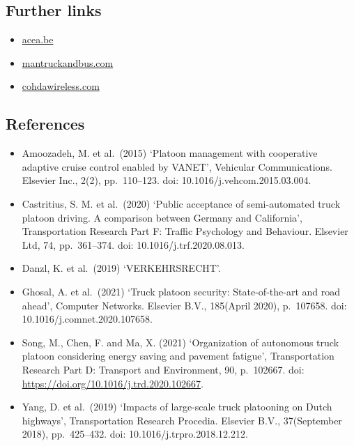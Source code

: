 \documentclass[
]{book}
\providecommand{\tightlist}{%
  \setlength{\itemsep}{0pt}\setlength{\parskip}{0pt}}
\begin{document}
\hypertarget{further-links-4}{%
\subsection*{Further links}\label{further-links-4}}

\begin{itemize}
\tightlist
\item
  \href{https://www.acea.be/uploads/publications/Platooning_roadmap.pdf}{acea.be}
\item
  \href{https://www.mantruckandbus.com/en/innovation/why-platooning-is-the-future-of-delivery-traffic.html}{mantruckandbus.com}
\item
  \href{https://cohdawireless.com/platooning/}{cohdawireless.com}
\end{itemize}

\hypertarget{references-5}{%
\subsection*{References}\label{references-5}}

\begin{itemize}
\tightlist
\item
  Amoozadeh, M. et al.~(2015) `Platoon management with cooperative adaptive cruise control enabled by VANET', Vehicular Communications. Elsevier Inc., 2(2), pp.~110--123. doi: 10.1016/j.vehcom.2015.03.004.
\item
  Castritius, S. M. et al.~(2020) `Public acceptance of semi-automated truck platoon driving. A comparison between Germany and California', Transportation Research Part F: Traffic Psychology and Behaviour. Elsevier Ltd, 74, pp.~361--374. doi: 10.1016/j.trf.2020.08.013.
\item
  Danzl, K. et al.~(2019) `VERKEHRSRECHT'.
\item
  Ghosal, A. et al.~(2021) `Truck platoon security: State-of-the-art and road ahead', Computer Networks. Elsevier B.V., 185(April 2020), p.~107658. doi: 10.1016/j.comnet.2020.107658.
\item
  Song, M., Chen, F. and Ma, X. (2021) `Organization of autonomous truck platoon considering energy saving and pavement fatigue', Transportation Research Part D: Transport and Environment, 90, p.~102667. doi: \url{https://doi.org/10.1016/j.trd.2020.102667}.
\item
  Yang, D. et al.~(2019) `Impacts of large-scale truck platooning on Dutch highways', Transportation Research Procedia. Elsevier B.V., 37(September 2018), pp.~425--432. doi: 10.1016/j.trpro.2018.12.212.
\end{itemize}
\end{document}
